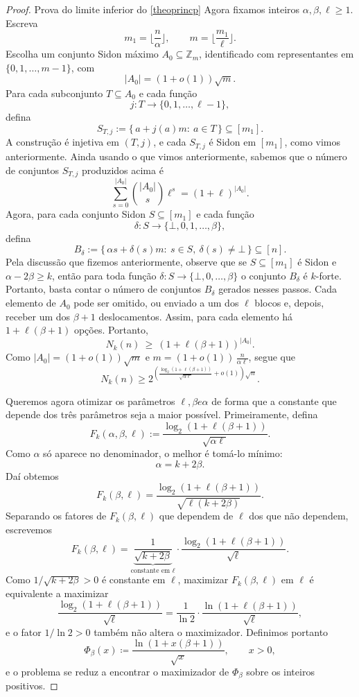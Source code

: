 \documentclass[reqno,a4paper,12pt]{amsart}
\begin{document}
\begin{proof}{Prova do limite inferior do \ref{theoprincp}}
  Agora fixamos inteiros \(\alpha,\beta,\ell\ge 1\). Escreva
  \[
    m_1=\Big\lfloor \frac{n}{\alpha}\Big\rfloor,
    \qquad
    m=\Big\lfloor \frac{m_1}{\ell}\Big\rfloor.
  \]
  Escolha um conjunto Sidon máximo \(A_0\subseteq\mathbb Z_m\), identificado com representantes em \(\{0,1,\dots,m-1\}\), com
  \[
    |A_0| = (1+o(1))\sqrt{m}.
  \]
  Para cada subconjunto \(T\subseteq A_0\) e cada função
  \[
    j:T\longrightarrow \{0,1,\dots,\ell-1\},
  \]
  defina
  \[
    S_{T,j}:=\{\,a+j(a)m:\ a\in T\,\}\subseteq [m_1].
  \]
  A construção é injetiva em \((T,j)\), e cada \(S_{T,j}\) é Sidon em \([m_1]\), como vimos anteriormente. Ainda usando o que vimos anteriormente, sabemos que o número de conjuntos \(S_{T,j}\) produzidos acima é
  \[
    \sum_{s=0}^{|A_0|}\binom{|A_0|}{s}\ell^s=(1+\ell)^{|A_0|}.
  \]
  Agora, para cada conjunto Sidon \(S\subseteq [m_1]\) e cada função
  \[
    \delta:S\longrightarrow \{\bot,0,1,\dots,\beta\},
  \]
  defina
  \[
    B_\delta:=\{\,\alpha s+\delta(s)m:\ s\in S,\ \delta(s)\neq \bot\,\}\subseteq [n].
  \]
  Pela discussão que fizemos anteriormente, observe que se \(S\subseteq [m_1]\) é Sidon e \(\alpha-2\beta\ge k\), então para toda função
  \(\delta:S\to\{\bot,0,\dots,\beta\}\) o conjunto \(B_\delta\) é \(k\)-forte. Portanto, basta contar o número de conjuntos $B_\delta$ gerados nesses passos. Cada elemento de \(A_0\) pode ser omitido, ou enviado a um dos \(\ell\) blocos e, depois, receber um dos \(\beta+1\) deslocamentos.
  Assim, para cada elemento há \(1+\ell(\beta+1)\) opções. Portanto,
  \[
    N_k(n)\ \ge\ (1+\ell(\beta+1))^{|A_0|}.
  \]
  Como \(|A_0|=(1+o(1))\sqrt m\) e \(m=(1+o(1))\,\frac{n}{\alpha\ell}\), segue que
  \[
    N_k(n)
    \ge
    2^{\left(
        \frac{\log_2(1+\ell(\beta+1))}{\sqrt{\alpha\ell}}+o(1)
        \right)\sqrt n}.
  \]

  Queremos agora otimizar os parâmetros $\ell, \beta e \alpha$ de forma que a constante que depende dos três parâmetros seja a maior possível. Primeiramente, defina \[
    F_k(\alpha,\beta,\ell)
    :=
    \frac{\log_2(1+\ell(\beta+1))}{\sqrt{\alpha\ell}}.
  \]
  Como \(\alpha\) só aparece no denominador, o melhor é tomá-lo mínimo:
  \[
    \alpha = k+2\beta.
  \]
  Daí obtemos
  \[
    F_k(\beta,\ell)
    =
    \frac{\log_2(1+\ell(\beta+1))}{\sqrt{\ell(k+2\beta)}}.
  \]
  Separando os fatores de $F_k(\beta,\ell)$ que dependem de $\ell$ dos que não dependem,
  escrevemos
  \[
    F_k(\beta,\ell)
    = \underbrace{\frac{1}{\sqrt{k+2\beta}}}_{\text{constante em }\ell}
    \cdot
    \frac{\log_2(1+\ell(\beta+1))}{\sqrt{\ell}}.
  \]
  Como $1/\sqrt{k+2\beta} > 0$ é constante em $\ell$, maximizar $F_k(\beta,\ell)$ em $\ell$
  é equivalente a maximizar
  \[
    \frac{\log_2(1+\ell(\beta+1))}{\sqrt{\ell}}
    = \frac{1}{\ln 2}\cdot\frac{\ln(1+\ell(\beta+1))}{\sqrt{\ell}},
  \]
  e o fator $1/\ln 2 > 0$ também não altera o maximizador. Definimos portanto
  \[
    \Phi_\beta(x)
    \coloneqq \frac{\ln(1+x(\beta+1))}{\sqrt{x}},
    \qquad x > 0,
  \]
  e o problema se reduz a encontrar o maximizador de $\Phi_\beta$ sobre os inteiros positivos.


\end{proof}
\end{document}
